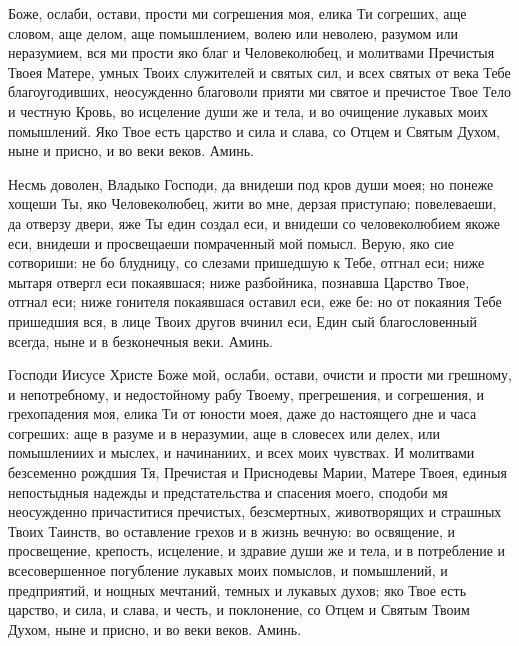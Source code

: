 

Боже, ослаби, остави, прости ми согрешения моя, елика Ти согреших, аще словом, аще делом, аще помышлением, волею или неволею, разумом или неразумием, вся ми прости яко благ и Человеколюбец, и молитвами Пречистыя Твоея Матере, умных Твоих служителей и святых сил, и всех святых от века Тебе благоугодивших, неосужденно благоволи прияти ми святое и пречистое Твое Тело и честную Кровь, во исцеление души же и тела, и во очищение лукавых моих помышлений. Яко Твое есть царство и сила и слава, со Отцем и Святым Духом, ныне и присно, и во веки веков. Аминь.



Несмь доволен, Владыко Господи, да внидеши под кров души моея; но понеже хощеши Ты, яко Человеколюбец, жити во мне, дерзая приступаю; повелеваеши, да отверзу двери, яже Ты един создал еси, и внидеши со человеколюбием якоже еси, внидеши и просвещаеши помраченный мой помысл. Верую, яко сие сотвориши: не бо блудницу, со слезами пришедшую к Тебе, отгнал еси; ниже мытаря отвергл еси покаявшася; ниже разбойника, познавша Царство Твое, отгнал еси; ниже гонителя покаявшася оставил еси, еже бе: но от покаяния Тебе пришедшия вся, в лице Твоих другов вчинил еси, Един сый благословенный всегда, ныне и в безконечныя веки. Аминь.



Господи Иисусе Христе Боже мой, ослаби, остави, очисти и прости ми грешному, и непотребному, и недостойному рабу Твоему, прегрешения, и согрешения, и грехопадения моя, елика Ти от юности моея, даже до настоящего дне и часа согреших: аще в разуме и в неразумии, аще в словесех или делех, или помышлениих и мыслех, и начинаниих, и всех моих чувствах. И молитвами безсеменно рождшия Тя, Пречистая и Приснодевы Марии, Матере Твоея, единыя непостыдныя надежды и предстательства и спасения моего, сподоби мя неосужденно причаститися пречистых, безсмертных, животворящих и страшных Твоих Таинств, во оставление грехов и в жизнь вечную: во освящение, и просвещение, крепость, исцеление, и здравие души же и тела, и в потребление и всесовершенное погубление лукавых моих помыслов, и помышлений, и предприятий, и нощных мечтаний, темных и лукавых духов; яко Твое есть царство, и сила, и слава, и честь, и поклонение, со Отцем и Святым Твоим Духом, ныне и присно, и во веки веков. Аминь.




